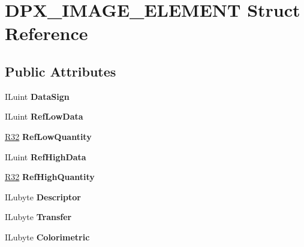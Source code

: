 \hypertarget{structDPX__IMAGE__ELEMENT}{}\section{D\+P\+X\+\_\+\+I\+M\+A\+G\+E\+\_\+\+E\+L\+E\+M\+E\+NT Struct Reference}
\label{structDPX__IMAGE__ELEMENT}
\subsection*{Public Attributes}
\begin{DoxyCompactItemize}
\item 
\mbox{\label{structDPX__IMAGE__ELEMENT_a4c4feab22c1dc444192cef2c9d76b010}} 
I\+Luint {\bfseries Data\+Sign}
\item 
\mbox{\label{structDPX__IMAGE__ELEMENT_a47fcadfce38a1b49cf65eff04dfdb4b0}} 
I\+Luint {\bfseries Ref\+Low\+Data}
\item 
\mbox{\label{structDPX__IMAGE__ELEMENT_a178a9eb164f4277056b1e0b77b51b390}} 
\hyperlink{structR32}{R32} {\bfseries Ref\+Low\+Quantity}
\item 
\mbox{\label{structDPX__IMAGE__ELEMENT_aff76a83baeeee51045edd084f7414eb6}} 
I\+Luint {\bfseries Ref\+High\+Data}
\item 
\mbox{\label{structDPX__IMAGE__ELEMENT_aab095b1d2c5785b7f39397659807b7bc}} 
\hyperlink{structR32}{R32} {\bfseries Ref\+High\+Quantity}
\item 
\mbox{\label{structDPX__IMAGE__ELEMENT_ab4d302379342f52108bdabf4a0007b9d}} 
I\+Lubyte {\bfseries Descriptor}
\item 
\mbox{\label{structDPX__IMAGE__ELEMENT_a76543eab29faaffab62d1160b143c0f7}} 
I\+Lubyte {\bfseries Transfer}
\item 
\mbox{\label{structDPX__IMAGE__ELEMENT_aa64f5ab5bc006dee50b7e819827b6df7}} 
I\+Lubyte {\bfseries Colorimetric}
\item 

\end{DoxyCompactItemize}
